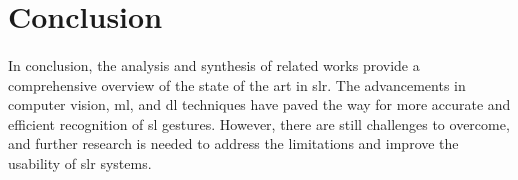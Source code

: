\section{Conclusion}
\paragraph{}
In conclusion, the analysis and synthesis of related works provide a comprehensive overview of the state of the art in \ac{slr}. The advancements in computer vision, \ac{ml}, and \ac{dl} techniques have paved the way for more accurate and efficient recognition of \ac{sl} gestures. However, there are still challenges to overcome, and further research is needed to address the limitations and improve the usability of \ac{slr} systems.